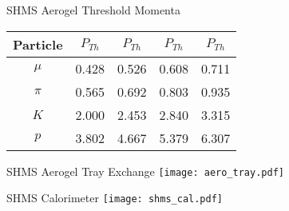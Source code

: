 \begin{Mtable}{SHMS Aerogel Threshold Momenta}
  \centering
  \begin{tabular}{|c|c|c|c|c|}
    \hline
    \textbf{Particle} & \textbf{$P_{Th}$} & \textbf{$P_{Th}$} & \textbf{$P_{Th}$} & \textbf{$P_{Th}$} \\
    \hline
    $\mu$ & 0.428 & 0.526 & 0.608 & 0.711 \\
    $\pi$ & 0.565 & 0.692 & 0.803 & 0.935 \\
    $K$ & 2.000 & 2.453 & 2.840 & 3.315 \\
    $p$ & 3.802 & 4.667 & 5.379 & 6.307 \\
    \hline
  \end{tabular}
  \caption{Threshold momenta ($P_{Th}$ in GeV/c) for a variety of charged particles and the corresponding refractive indices.}
  \label{tab:2-4_aero_threshold}
\end{Mtable}

\begin{Mfigure}{SHMS Aerogel Tray Exchange}
  \centering
  \texttt{[image: aero\_tray.pdf]}
  \caption{View of an aerogel tray being lifted out of the SHMS hut. The tray maintains its 18$\degree$ angle until it is slowly lowerd on the pallet.}
  \label{fig:2-4_aero_tray}
\end{Mfigure}

\begin{Mfigure}{SHMS Calorimeter}
  \centering
  \texttt{[image: shms\_cal.pdf]}
  \caption{View of the SHMS calorimeter which shows the preshow and shower, along with their corresponding lead glass blocks.}
  \label{fig:2-4_shms_cal}
\end{Mfigure}

%
%
